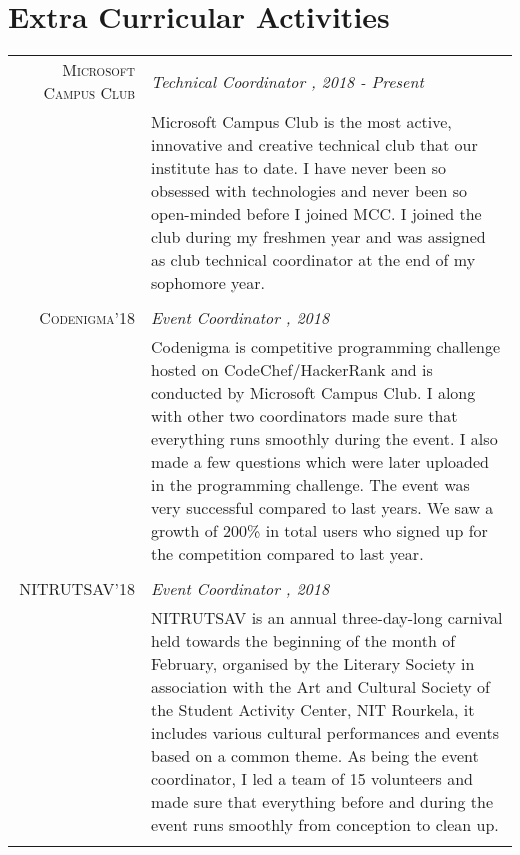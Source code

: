 \documentclass[a4paper,10pt]{article}
\begin{document}
\section{Extra Curricular Activities}
\begin{tabular}{r|p{11cm}}
\textsc{Microsoft Campus Club} & \emph{Technical Coordinator , 2018 - Present}\\
&\footnotesize{Microsoft Campus Club is the most active, innovative and creative technical club that our institute has to date. I have never been so obsessed with technologies and never been so open-minded before I joined MCC. I joined the club during my freshmen year and was assigned as club technical coordinator at the end of my sophomore year. }\\ \\

\textsc{Codenigma'18} & \emph{Event Coordinator , 2018}\\
&\footnotesize{Codenigma is competitive programming challenge hosted on CodeChef/HackerRank and is conducted by Microsoft Campus Club. I along with other two coordinators made sure that everything runs smoothly during the event. I also made a few questions which were later uploaded in the programming challenge. The event was very successful compared to last years. We saw a growth of 200\% in total users who signed up for the competition compared to last year. }\\ \\

\textsc{NITRUTSAV'18} & \emph{Event Coordinator , 2018}\\
&\footnotesize{NITRUTSAV is an annual three-day-long carnival held towards the beginning of the month of February, organised by the Literary Society in association with the Art and Cultural Society of the Student Activity Center, NIT Rourkela, it includes various cultural performances and events based on a common theme. As being the event coordinator, I led a team of 15 volunteers and made sure that everything before and during the event runs smoothly from conception to clean up. }\\ \\
 

\end{tabular}
\end{document}
